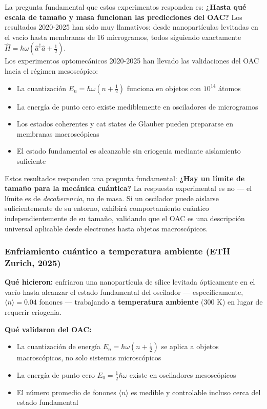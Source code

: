\documentclass[11pt,a4paper,spanish]{book}
\begin{document}
La pregunta fundamental que estos experimentos responden es: \textbf{¿Hasta qué escala de tamaño y masa funcionan las predicciones del OAC?} Los resultados 2020-2025 han sido muy llamativos: desde nanopartículas levitadas en el vacío hasta membranas de 16 microgramos, todos siguiendo exactamente $\hat{H} = \hbar\omega(\hat{a}^\dagger\hat{a} + \frac{1}{2})$.\\

Los experimentos optomecánicos 2020-2025 han llevado las validaciones del OAC hacia el régimen mesoscópico:

\begin{itemize}
	\item La cuantización $E_n = \hbar\omega(n + \frac{1}{2})$ funciona en objetos con $10^{14}$ átomos
	\item La energía de punto cero existe mediblemente en osciladores de microgramos
	\item Los estados coherentes y cat states de Glauber pueden prepararse en membranas macroscópicas
	\item El estado fundamental es alcanzable sin criogenia mediante aislamiento suficiente

\end{itemize}

Estos resultados responden una pregunta fundamental: \textbf{¿Hay un límite de tamaño para la mecánica cuántica?} La respuesta experimental es no — el límite es de \emph{decoherencia}, no de masa. Si un oscilador puede aislarse suficientemente de su entorno, exhibirá comportamiento cuántico independientemente de su tamaño, validando que el OAC es una descripción universal aplicable desde electrones hasta objetos macroscópicos.

\subsubsection{Enfriamiento cuántico a temperatura ambiente (ETH Zurich, 2025)}

\textbf{Qué hicieron:} \cite{dania2025} enfriaron una nanopartícula de sílice levitada ópticamente en el vacío hasta alcanzar el estado fundamental del oscilador — específicamente, $\langle n \rangle = 0.04$ fonones — trabajando \textbf{a temperatura ambiente} (300 K) en lugar de requerir criogenia.

\textbf{Qué validaron del OAC:} 
\begin{itemize}
	\item La cuantización de energía $E_n = \hbar\omega(n + \frac{1}{2})$ se aplica a objetos macroscópicos, no solo sistemas microscópicos
	\item La energía de punto cero $E_0 = \frac{1}{2}\hbar\omega$ existe en osciladores mesoscópicos
	\item El número promedio de fonones $\langle n \rangle$ es medible y controlable incluso cerca del estado fundamental
\end{itemize}
\end{document}

